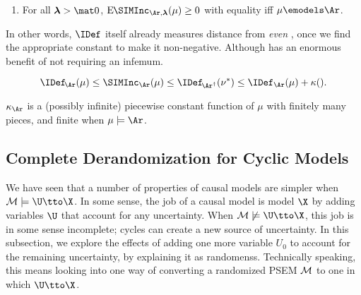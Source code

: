 \begin{subappendices}
{\begin{prop}
    \begin{enumerate}[label={\normalfont(\alph*)},wide]
    \item For all $\boldsymbol{\lambda} > \mat 0$, $\mathrm{E}\mskip-1mu\SIMInc_{\Ar, \boldsymbol\lambda}(\mu) \ge 0$ with equality iff $\mu \emodels \Ar$.
    \end{enumerate}
\end{prop}

In other words, $\IDef$ itself already measures distance from \emph{even \scibility}, once we find the appropriate constant to make it non-negative. 
Although has an enormous benefit of not requiring an infemum. 

\[
    \IDef_{\!\Ar}(\mu)
    \le \SIMInc_{\Ar}(\mu)
    \le \IDef_{\!\Ar^\dagger}(\nu^*)
    \le \IDef_{\Ar}(\mu) + \kappa()
    .
\]

$\kappa_\Ar$ is a (possibly infinite) piecewise constant function of $\mu$ with finitely many pieces,
and finite when $\mu \models \Ar$. 

\subsection{Complete Derandomization for Cyclic Models}
    \label{ssec:full-derandomize}
We have seen that a number of properties of causal models are simpler when $\mathcal M \models \U \tto \X$. 
In some sense, the job of a causal model is model $\X$ by adding variables $\U$ that account for any uncertainty. 
When $\mathcal M \not\models \U \tto \X$, this job is in some sense incomplete; cycles can create a new source of uncertainty. 
In this subsection, we explore the effects of adding one more variable $U_0$ to account for the remaining uncertainty, by explaining it as randomenss.
Technically speaking, this means looking into one way of converting a 
    randomized PSEM $\cal M$ to one in which $\U \tto \X$.


}
\end{subappendices}
